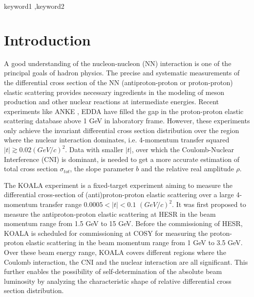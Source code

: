 \documentclass[number]{elsarticle}
\begin{document}
\begin{frontmatter}
\begin{abstract}

  \end{abstract}

  \begin{keyword}
    keyword1 \sep keyword2
  \end{keyword}

\end{frontmatter}


\newpage
\tableofcontents
\newpage

\section{Introduction}
\label{sec:introduction}

A good understanding of the nucleon-nucleon (NN) interaction is one of the principal goals of hadron physics.
The precise and systematic measurements of the differential cross section of the NN (antiproton-proton or proton-proton) elastic scattering provides necessary ingredients
in the modeling of meson production and other nuclear reactions at intermediate energies.
Recent experiments like ANKE \cite{ANKE}, EDDA \cite{EDDA} have filled the gap in the proton-proton elastic scattering database above 1 GeV in laboratory frame.
However, these experiments only achieve the invariant differential cross section distribution over the region where the nuclear interaction dominates, 
i.e. 4-momentum transfer squared \(|t| \gtrsim 0.02 (GeV/c)^2\).
Data with smaller \(|t|\), over which the Coulomb-Nuclear Interference (CNI) is dominant, is needed to get a more accurate estimation of total cross section \({\sigma}_{tot}\), the slope parameter \(b\) and the relative real amplitude \(\rho\).

The KOALA experiment is a fixed-target experiment aiming to measure the differential cross-section of (anti)proton-proton elastic scattering 
over a large 4-momentum transfer range \(0.0005 < |t| < 0.1\) \((GeV/c)^2\).
It was first proposed to measure the antiproton-proton elastic scattering at HESR in the beam momentum range from 1.5 GeV to 15 GeV.
Before the commissioning of HESR, KOALA is scheduled for commissioning at COSY for measuring the proton-proton elastic scattering in the beam momentum range from 1 GeV to 3.5 GeV.
Over these beam energy range, KOALA covers different regions where the Coulomb interaction, the CNI and the nuclear interaction are all significant.
This further enables the possibility of self-determination of the absolute beam luminosity by analyzing the characteristic shape of relative differential cross section distribution.
\end{document}
